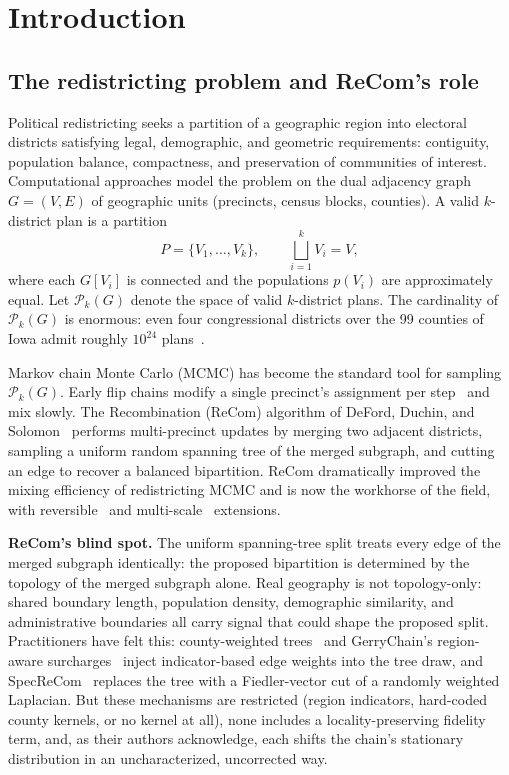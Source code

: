 \documentclass[11pt]{article}
\begin{document}
\tableofcontents
\newpage

\section{Introduction}\label{sec:intro}

\subsection{The redistricting problem and ReCom's role}\label{sec:intro-problem}

Political redistricting seeks a partition of a geographic region into
electoral districts satisfying legal, demographic, and geometric
requirements: contiguity, population balance, compactness, and
preservation of communities of interest. Computational approaches model
the problem on the dual adjacency graph $G = (V,E)$ of geographic units
(precincts, census blocks, counties). A valid $k$-district plan is a
partition
\[
  P = \{V_1, \ldots, V_k\}, \qquad \bigsqcup_{i=1}^k V_i = V,
\]
where each $G[V_i]$ is connected and the populations $p(V_i)$ are
approximately equal. Let $\mathcal{P}_k(G)$ denote the space of valid
$k$-district plans. The cardinality of $\mathcal{P}_k(G)$ is enormous:
even four congressional districts over the 99 counties of Iowa admit
roughly $10^{24}$ plans~\cite{fifield2020essential}.

Markov chain Monte Carlo (MCMC) has become the standard tool for
sampling $\mathcal{P}_k(G)$. Early flip chains modify a single
precinct's assignment per step~\cite{fifield2020automated} and mix
slowly. The Recombination (ReCom) algorithm of DeFord, Duchin, and
Solomon~\cite{deford2021recombination} performs multi-precinct updates
by merging two adjacent districts, sampling a uniform random spanning
tree of the merged subgraph, and cutting an edge to recover a balanced
bipartition. ReCom dramatically improved the mixing efficiency of
redistricting MCMC and is now the workhorse of the field, with
reversible~\cite{cannon2022spanning} and multi-scale~\cite{autry2020multiscale}
extensions.

\textbf{ReCom's blind spot.} The uniform spanning-tree split treats
every edge of the merged subgraph identically: the proposed
bipartition is determined by the topology of the merged subgraph
alone. Real geography is not topology-only: shared boundary
length, population density, demographic similarity, and
administrative boundaries all carry signal that could shape the
proposed split. Practitioners have felt this: county-weighted
trees~\cite{clelland2022colorado} and GerryChain's region-aware
surcharges~\cite{gerrychain2024} inject indicator-based edge weights
into the tree draw, and SpecReCom~\cite{davies2025spectral} replaces
the tree with a Fiedler-vector cut of a randomly weighted Laplacian.
But these mechanisms are restricted (region indicators, hard-coded
county kernels, or no kernel at all), none includes a
locality-preserving fidelity term, and, as their authors
acknowledge, each shifts the chain's stationary distribution in
an uncharacterized, uncorrected way.
\end{document}
